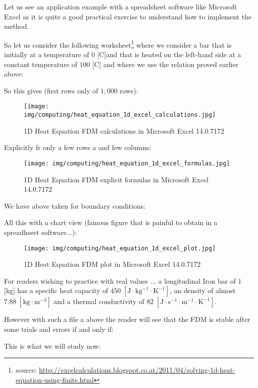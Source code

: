 	Let us see an application example with a spreadsheet software like Microsoft Excel as it is quite a good practical exercise to understand how to implement the method.
	
	So let us consider the following worksheet\footnote{source: \url{http://excelcalculations.blogspot.co.at/2011/04/solving-1d-heat-equation-using-finite.html}} where we consider a bar that is initially at a temperature of $0$ [C]and that is heated on the left-hand side at a constant temperature of $100$ [C] and where we use the relation proved earlier above:
	
	So this gives (first rows only of $1,000$ rows): 
	\begin{figure}[H]
		\centering
		\texttt{[image: img/computing/heat\_equation\_1d\_excel\_calculations.jpg]}
		\caption{1D Heat Equation FDM calculations in Microsoft Excel 14.0.7172}
	\end{figure}
	Explicitly fr only a few rows a and few columns:
	\begin{figure}[H]
		\centering
		\texttt{[image: img/computing/heat\_equation\_1d\_excel\_formulas.jpg]}
		\caption{1D Heat Equation FDM explicit formulas in Microsoft Excel 14.0.7172}
	\end{figure}
	We have above taken for boundary conditions:
	 
	
	All this with a chart view (famous figure that is painful to obtain in a spreadhseet software...):
	\begin{figure}[H]
		\centering
		\texttt{[image: img/computing/heat\_equation\_1d\_excel\_plot.jpg]}
		\caption{1D Heat Equation FDM plot in Microsoft Excel 14.0.7172}
	\end{figure}
	

	For readers wishing to practice with real values ... a longitudinal Iron bar of $1$ [kg] has a specific heat capacity of $450\;[\text{J}\cdot\text{kg}^{-1}\cdot\text{K}^{-1}]$, an density of almost $7.88\;[\text{kg}\cdot \text{m}^{-3}]$ and a thermal conductivity of $82\;[\text{J}\cdot\text{s}^{-1}\cdot\text{m}^{-1}\cdot\text{K}^{-1}]$.
	
	However with such a file a above the reader will see that the FDM is stable   after some trials and errors if and only if:
	
	This is what we will study now:
	
